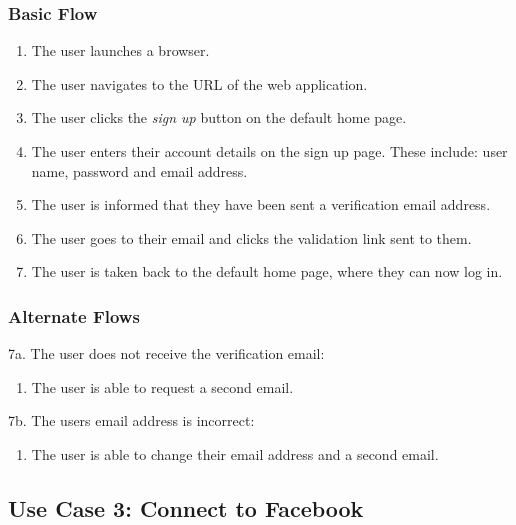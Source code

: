 \documentclass[12pt,onecolumn]{article}
\begin{document}
		\subsubsection{Basic Flow}

		\begin{enumerate}
			\item The user launches a browser.

			\item The user navigates to the URL of the web application.

			\item The user clicks the \emph{sign up} button on the default home page.

			\item The user enters their account details on the sign up page. These include: user name, password and email address.

			\item The user is informed that they have been sent a verification email address.

			\item The user goes to their email and clicks the validation link sent to them.

			\item The user is taken back to the default home page, where they can now log in.

		\end{enumerate}

		\subsubsection{Alternate Flows}

		7a. The user does not receive the verification email:

		\begin{enumerate}
			\item The user is able to request a second email.
		\end{enumerate}

		7b. The users email address is incorrect:

		\begin{enumerate}
			\item The user is able to change their email address and a second email.
		\end{enumerate}
	
	\subsection{Use Case 3: Connect to Facebook}
\end{document}
